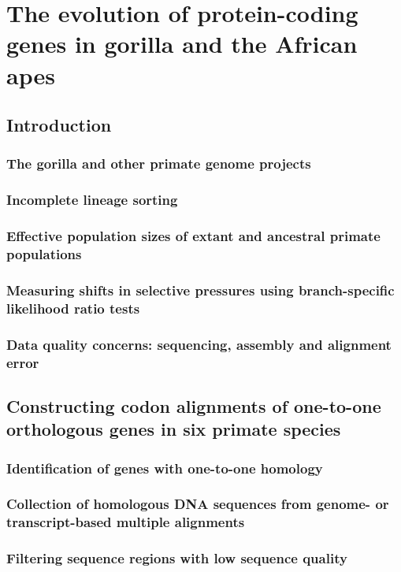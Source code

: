 \chapter{The evolution of protein-coding genes in gorilla and the African apes}
\section{Introduction}
\subsection{The gorilla and other primate genome projects}
\subsection{Incomplete lineage sorting}
\subsection{Effective population sizes of extant and ancestral primate populations}
\subsection{Measuring shifts in selective pressures using branch-specific likelihood ratio tests}
\subsection{Data quality concerns: sequencing, assembly and alignment error}
\section{Constructing codon alignments of one-to-one orthologous genes in six primate species}
\subsection{Identification of genes with one-to-one homology}
\subsection{Collection of homologous DNA sequences from genome- or transcript-based multiple alignments}
\subsection{Filtering sequence regions with low sequence quality}
